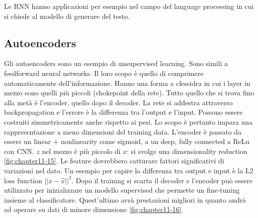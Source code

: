 	Le RNN hanno applicazioni per esempio nel campo del language processing in cui si chiede al modello di generare del testo.
	
	\subsection{Autoencoders}
	Gli autoencoders sono un esempio di unsupervised learning.
	Sono simili a feedforward neural networks.
	Il loro scopo \`e quello di comprimere automaticamente dell'informazione.
	Hanno una forma a clessidra in cui i layer in mezzo sono quelli pi\`u piccoli (chokepoint della rete).
	Tutto quello che si trova fino alla met\`a \`e l'encoder, quello dopo il decoder.
	La rete si addestra attraverso backpropagation e l'errore \`e la differenza tra l'output e l'input.
	Possono essere costruiti simmetricamente anche rispetto ai pesi.
	Lo scopo \`e pertanto impara una rappresentazione a meno dimensioni del training data.
	L'encoder \`e passato da essere un linear + nonlinearity come sigmoid, a un deep, fully connected a ReLu con CNN.
	$z$ nel mezzo \`e pi\`u piccolo di $x$: si svolge una dimensionality reduction \ref{fig:chapter11-15}.
	Le feature dovrebbero catturare fattori significativi di variazioni nel dato.
	Un esempio per capire la differenza tra output e input \`e la L2 loss function $||x-\hat{x}||^2$.
	Dopo il training si scarta il decoder e l'encoder pu\`o essere utilizzato per inizializzare un modello supervised che permette un fine-tuning insieme al classificatore. 
	Quest'ultimo avr\`a prestazioni migliori in quanto andr\`a ad operare su dati di minore dimensione \ref{fig:chapter11-16}. 
	
